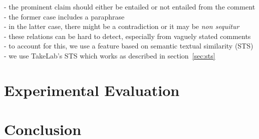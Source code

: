 - the prominent claim should either be entailed or not entailed from the comment \\
- the former case includes a paraphrase \\
- in the latter case, there might be a contradiction or it may be \textit{non sequitur} \\
- these relations can be hard to detect, especially from vaguely stated comments \\
- to account for this, we use a feature based on semantic textual similarity (STS) \\
- we use TakeLab's STS \citep{vsaric2012takelab} which works as described in
section~\ref{sec:sts} \\


\section{Experimental Evaluation}
\label{sec:argrec_experiments}

\section{Conclusion}
\label{sec:argrec_conclusion}
